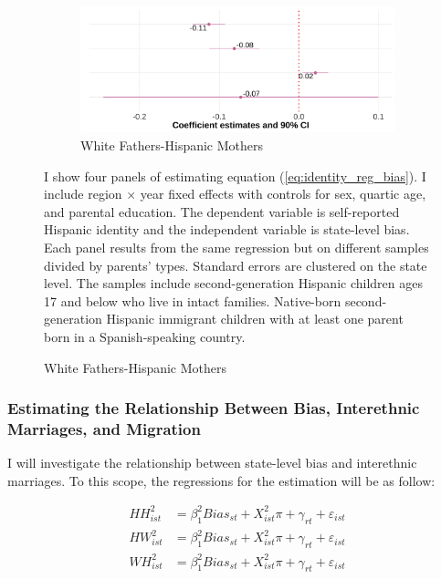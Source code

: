 \documentclass[12pt, fullpage]{article}
\newcommand{\note}[1]{\flushleft\footnotesize{#1}}
\begin{document}
\begin{center}
\begin{figure}[H]
\begin{subfigure}{.48\textwidth}
\caption{White Fathers-Hispanic Mothers}
\centering
\includegraphics[width=.9\linewidth]{figure/by-parents-regs-wh.png}
\end{subfigure}
\flushleft\footnotesize{\note{I show four panels of estimating equation (\ref{eq:identity_reg_bias}). I include region $\times$ year fixed effects with controls for sex, quartic age, and parental education. The dependent variable is self-reported Hispanic identity and the independent variable is state-level bias. Each panel results from the same regression but on different samples divided by parents' types. Standard errors are clustered on the state level. The samples include second-generation Hispanic children ages 17 and below who live in intact families. Native-born second-generation Hispanic immigrant children with at least one parent born in a Spanish-speaking country.}}
\end{figure}
\end{center}

\subsubsection{Estimating the Relationship Between Bias, Interethnic Marriages, and Migration} %
\label{sub:the_determinants_of_hispanic_identity}

I will investigate the relationship between state-level bias and interethnic marriages. To this scope, the regressions for the estimation will be as follow:

\begin{align}
HH_{ist}^2 &= \beta_1^2 Bias_{st} + X_{ist}^2\pi + \gamma_{rt} 
            + \varepsilon_{ist} \nonumber \\
HW_{ist}^2 &= \beta_1^2 Bias_{st} + X_{ist}^2\pi + \gamma_{rt} 
            + \varepsilon_{ist}  \label{eq:inter-hw} \\
WH_{ist}^2 &= \beta_1^2 Bias_{st} + X_{ist}^2\pi + \gamma_{rt} 
            + \varepsilon_{ist}  \nonumber
\end{align}
\end{document}
